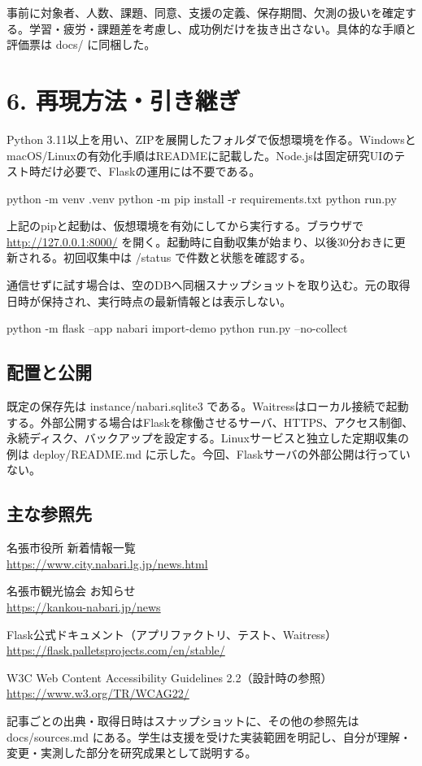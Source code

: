 \documentclass[a4paper,10pt]{ltjsarticle}
\begin{document}
事前に対象者、人数、課題、同意、支援の定義、保存期間、欠測の扱いを確定する。学習・疲労・課題差を考慮し、成功例だけを抜き出さない。具体的な手順と評価票は docs/ に同梱した。


\clearpage

\section*{6. 再現方法・引き継ぎ}

Python 3.11以上を用い、ZIPを展開したフォルダで仮想環境を作る。WindowsとmacOS/Linuxの有効化手順はREADMEに記載した。Node.jsは固定研究UIのテスト時だけ必要で、Flaskの運用には不要である。


\begin{Code}
python -m venv .venv
python -m pip install -r requirements.txt
python run.py
\end{Code}

上記のpipと起動は、仮想環境を有効にしてから実行する。ブラウザで \url{http://127.0.0.1:8000/} を開く。起動時に自動収集が始まり、以後30分おきに更新される。初回収集中は /status で件数と状態を確認する。


通信せずに試す場合は、空のDBへ同梱スナップショットを取り込む。元の取得日時が保持され、実行時点の最新情報とは表示しない。


\begin{Code}
python -m flask --app nabari import-demo
python run.py --no-collect
\end{Code}

\subsection*{配置と公開}

既定の保存先は instance/nabari.sqlite3 である。Waitressはローカル接続で起動する。外部公開する場合はFlaskを稼働させるサーバ、HTTPS、アクセス制御、永続ディスク、バックアップを設定する。Linuxサービスと独立した定期収集の例は deploy/README.md に示した。今回、Flaskサーバの外部公開は行っていない。


\subsection*{主な参照先}

名張市役所 新着情報一覧\\
\url{https://www.city.nabari.lg.jp/news.html}


名張市観光協会 お知らせ\\
\url{https://kankou-nabari.jp/news}


Flask公式ドキュメント（アプリファクトリ、テスト、Waitress）\\
\url{https://flask.palletsprojects.com/en/stable/}


W3C Web Content Accessibility Guidelines 2.2（設計時の参照）\\
\url{https://www.w3.org/TR/WCAG22/}


記事ごとの出典・取得日時はスナップショットに、その他の参照先は docs/sources.md にある。学生は支援を受けた実装範囲を明記し、自分が理解・変更・実測した部分を研究成果として説明する。
\end{document}
